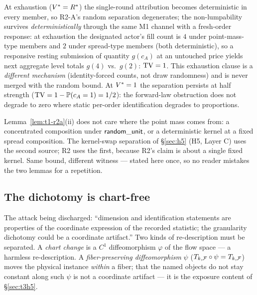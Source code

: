 \begin{remark}[exhaustion and $\Vstar = 1$ strata]
\label{rem:t1-exhaustion}
At exhaustion ($V^{*} = R^{*}$) the single-round attribution becomes
deterministic in every member, so R2-A's random separation degenerates; the
non-lumpability survives \emph{deterministically} through the same M1
channel with a fresh-order response: at exhaustion the designated actor's
fill count is $4$ under point-mass-type members and $2$ under spread-type
members (both deterministic), so a responsive resting submission of quantity
$g(c_A)$ at an untouched price yields next aggregate level totals $g(4)$
vs.\ $g(2)$: $\operatorname{TV} = 1$. This exhaustion clause is a \emph{different
mechanism} (identity-forced counts, not draw randomness) and is never merged
with the random bound. At $\Vstar = 1$ the separation persists at half
strength ($\operatorname{TV} = 1 - \mathbb{P}(c_A = 1) = 1/2$): the forward-law obstruction
does not degrade to zero where static per-order identification degrades to
proportions.
\end{remark}

\begin{remark}
\label{rem:t1-unify}
Lemma~\ref{lem:t1-r2a}(ii) does not care where the point mass comes from: a
concentrated composition under $\mathsf{random\_unit}$, or a deterministic kernel at a fixed
spread composition. The kernel-swap separation of \S\ref{sec:h5} (H5, Layer
C) uses the second source; R2 uses the first, because R2's claim is about a
single fixed kernel. Same bound, different witness --- stated here once, so
no reader mistakes the two lemmas for a repetition.
\end{remark}

\subsection{The dichotomy is chart-free}
\label{sec:t1-chartfree}

The attack being discharged: ``dimension and identification statements are
properties of the coordinate expression of the recorded statistic; the
granularity dichotomy could be a coordinate artifact.'' Two kinds of
re-description must be separated. A \emph{chart change} is a $C^1$
diffeomorphism $\varphi$ of the flow space --- a harmless re-description. A
\emph{fiber-preserving diffeomorphism} $\psi$ ($T_{k,\mathcal{F}} \circ \psi =
T_{k,\mathcal{F}}$) moves the physical instance \emph{within} a fiber; that the
named objects do not stay constant along such $\psi$ is not a coordinate
artifact --- it is the exposure content of \S\ref{sec:t3h5}.

